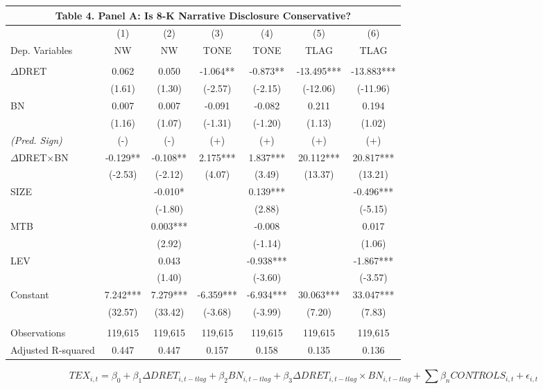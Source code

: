 \begin{table}[H] \label{T4PA}%
	\begin{center}
		\begin{tabular}{lcccccc}
			\multicolumn{7}{c}{\textbf{Table 4. Panel A: Is 8-K Narrative Disclosure Conservative?}} \\
			\midrule
			\midrule
			& (1) & (2) & (3) & (4) & (5) & (6) \\
			Dep. Variables & NW & NW & TONE & TONE & TLAG & TLAG \\
			\midrule
			&   &   &   &   &   &  \\
			$\Delta$DRET & 0.062 & 0.050 & -1.064** & -0.873** & -13.495*** & -13.883*** \\
			& (1.61) & (1.30) & (-2.57) & (-2.15) & (-12.06) & (-11.96) \\
			BN & 0.007 & 0.007 & -0.091 & -0.082 & 0.211 & 0.194 \\
			& (1.16) & (1.07) & (-1.31) & (-1.20) & (1.13) & (1.02) \\
			\rowcolor[rgb]{ .933,  .925,  .882} \textit{(Pred. Sign)} & (-) & (-) & (+) & (+) & (+) & (+) \\
			\rowcolor[rgb]{ .933,  .925,  .882} $\Delta$DRET$\times$BN & -0.129** & -0.108** & 2.175*** & 1.837*** & 20.112*** & 20.817*** \\
			\rowcolor[rgb]{ .933,  .925,  .882}   & (-2.53) & (-2.12) & (4.07) & (3.49) & (13.37) & (13.21) \\
			SIZE &   & -0.010* &   & 0.139*** &   & -0.496*** \\
			&   & (-1.80) &   & (2.88) &   & (-5.15) \\
			MTB &   & 0.003*** &   & -0.008 &   & 0.017 \\
			&   & (2.92) &   & (-1.14) &   & (1.06) \\
			LEV &   & 0.043 &   & -0.938*** &   & -1.867*** \\
			&   & (1.40) &   & (-3.60) &   & (-3.57) \\
			Constant & 7.242*** & 7.279*** & -6.359*** & -6.934*** & 30.063*** & 33.047*** \\
			& (32.57) & (33.42) & (-3.68) & (-3.99) & (7.20) & (7.83) \\
			&   &   &   &   &   &  \\
			Observations & 119,615 & 119,615 & 119,615 & 119,615 & 119,615 & 119,615 \\
			Adjusted R-squared & 0.447 & 0.447 & 0.157 & 0.158 & 0.135 & 0.136 \\
			\bottomrule
			\bottomrule
		\end{tabular}%
	\end{center}
		\begin{footnotesize}
			\setcounter{equation}{1}
			\begin{equation}
				TEX_{i,t}=\beta_0+\beta_1\Delta DRET_{i,t-tlag}+\beta_2BN_{i,t-tlag}+\beta_3\Delta DRET_{i,t-tlag}\times 	BN_{i,t-tlag}+\sum\beta_nCONTROLS_{i,t}+\epsilon_{i,t}
			\end{equation}
			

\end{footnotesize}
\end{table}
